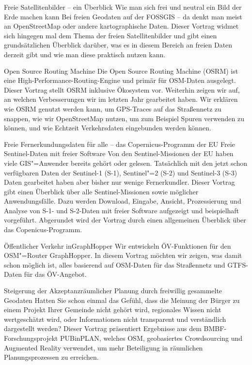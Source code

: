 \renewcommand{\konferenztag}{\freitag}
%
{Freie Satellitenbilder -- ein Überblick}%
{Wie man sich frei und neutral ein Bild der Erde machen kann}%
{Bei freien Geodaten auf der FOSSGIS -- da denkt man meist an OpenStreetMap oder andere
kartographische Daten. Dieser Vortrag widmet sich hingegen mal dem Thema der freien Satellitenbilder
und gibt einen grundsätzlichen Überblick darüber, was es in diesem Bereich an freien Daten derzeit
gibt und wie man diese praktisch nutzen kann.}


%
{Open Source Routing Machine}%
{}
{Die Open Source Routing Machine (OSRM) ist eine High-Performance-Routing-Engine und primär für
  OSM-Daten ausgelegt. Dieser Vortrag stellt OSRM inklusive Ökosystem vor. Weiterhin
  zeigen wir auf, an welchen Verbesserungen wir im letzten Jahr gearbeitet haben. Wir erklären wie
  OSRM genutzt werden kann, um GPS-Traces auf das Straßennetz zu snappen, wie wir OpenStreetMap
  nutzen, um zum Beispiel Spuren verwenden zu können, und wie Echtzeit Verkehrsdaten eingebunden
werden können.}

%
{Freie Fernerkundungsdaten für alle – das Copernicus-Programm der EU}%
{Freie Sentinel-Daten mit freier Software}%
{Von den Sentinel-Missionen der EU haben viele GIS"=Anwender bereits gehört oder gelesen. Tatsächlich
mit den jetzt schon verfügbaren Daten der Sentinel-1 (S-1), Sentinel"=2 (S-2) und Sentinel-3 (S-3)
Daten gearbeitet haben aber bisher nur wenige Fernerkundler. Dieser Vortrag gibt einen Überblick
über alle Sentinel-Missionen sowie möglicher Anwendungsfälle. Dazu werden Download, Eingabe,
Ansicht, Prozessierung und Analyse von S-1- und S-2-Daten mit freier Software aufgezeigt und
beispielhaft vorgeführt. Abgerundet wird der Vortrag durch einen allgemeinen Überblick über das
Copenicus-Programm.}



%
{Öffentlicher Verkehr in\newline GraphHopper}%
{}%
{Wir entwickeln ÖV-Funktionen für den OSM"=Router GraphHopper. In diesem Vortrag möchten
wir zeigen, was damit schon möglich ist, alles basierend auf OSM-Daten für das Straßennetz und
GTFS-Daten für das ÖV-Angebot.}

%
{Steigerung der Akzeptanz\newline räumlicher Planung durch freiwillig gesammelte Geodaten}%
{}%
{Hatten Sie schon einmal das Gefühl, dass die Meinung der Bürger zu einem Projekt Ihrer Gemeinde
nicht gehört wird, regionales Wissen nicht wertgeschätzt wird, oder Informationen nicht transparent
und verständlich dargestellt werden? Dieser Vortrag präsentiert Ergebnisse aus dem
BMBF-Forschungsprojekt PUBinPLAN, welches OSM, geobasiertes Crowdsourcing und Augmented
Reality verwendet, um mehr Beteiligung in räumlichen Planungsprozessen zu erreichen. }

